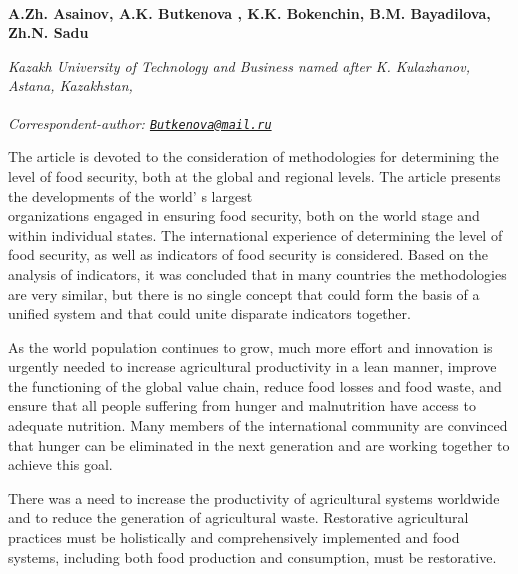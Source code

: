 
\begin{articleheader}

{\bfseries  
A.Zh. Asainov,
A.K. Butkenova\textsuperscript{\envelope } ,
K.K. Bokenchin,
B.M. Bayadilova,
Zh.N. Sadu}
\end{articleheader}

\begin{affiliation}
\emph{Kazakh University of Technology and Business named after K. Kulazhanov, Astana, Kazakhstan,}

\raggedright \textsuperscript{\envelope }{\em Correspondent-author: \href{mailto:Butkenova@mail.ru}{\nolinkurl{Butkenova@mail.ru}}}
\end{affiliation}

The article is devoted to the consideration of methodologies for
determining the level of food security, both at the global and regional
levels. The article presents the developments of the
world' s largest \\organizations engaged in ensuring food
security, both on the world stage and within individual states. The
international experience of determining the level of food security, as
well as indicators of food security is considered. Based on the analysis
of indicators, it was concluded that in many countries the methodologies
are very similar, but there is no single concept that could form the
basis of a unified system and that could unite disparate indicators
together.

As the world population continues to grow, much more effort and
innovation is urgently needed to increase agricultural productivity in a
lean manner, improve the functioning of the global value chain, reduce
food losses and food waste, and ensure that all people suffering from
hunger and malnutrition have access to adequate nutrition. Many members
of the international community are convinced that hunger can be
eliminated in the next generation and are working together to achieve
this goal.

There was a need to increase the productivity of agricultural systems
worldwide and to reduce the generation of agricultural waste.
Restorative agricultural practices must be holistically and
comprehensively implemented and food systems, including both food
production and consumption, must be restorative.

